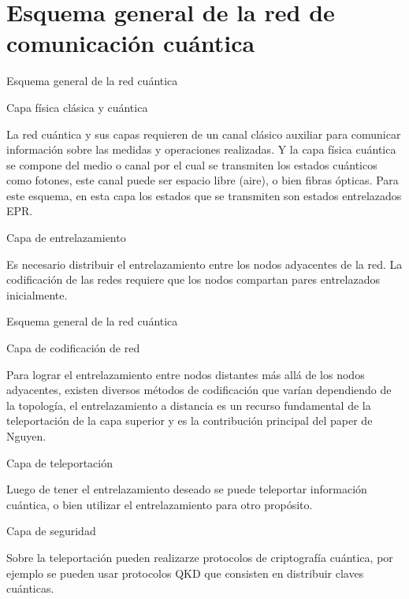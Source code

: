 \documentclass[10pt]{beamer}
\renewenvironment{block}[1]
    {\begin{oldblock}{#1}
        \smallskip
    }
    {
    \end{oldblock}
    }
\begin{document}
\section{Esquema general de la red de comunicación cuántica}
\begin{frame}{Esquema general de la red cuántica}
  \begin{block}{Capa física clásica y cuántica}
    La red cuántica y sus capas requieren de un canal clásico auxiliar para comunicar información sobre las medidas y operaciones realizadas. Y la capa física cuántica se compone del medio o canal por el cual se transmiten los estados cuánticos como fotones, este canal puede ser espacio libre (aire), o bien fibras ópticas. Para este esquema, en esta capa los estados que se transmiten son estados entrelazados EPR.
  \end{block}
  \begin{block}{Capa de entrelazamiento}
    Es necesario distribuir el entrelazamiento entre los nodos adyacentes de la red. La codificación de las redes requiere que los nodos compartan pares entrelazados inicialmente.
  \end{block}
\end{frame}
\begin{frame}{Esquema general de la red cuántica}

  \begin{block}{Capa de codificación de red}
    Para lograr el entrelazamiento entre nodos distantes más allá de los nodos adyacentes, existen diversos métodos de codificación que varían dependiendo de la topología, el entrelazamiento a distancia es un recurso fundamental de la teleportación de la capa superior y es la contribución principal del paper de Nguyen.
  \end{block}
  \begin{block}{Capa de teleportación}
    Luego de tener el entrelazamiento deseado se puede teleportar información cuántica, o bien utilizar el entrelazamiento para otro propósito.
  \end{block}
  \begin{block}{Capa de seguridad}
    Sobre la teleportación pueden realizarze protocolos de criptografía cuántica, por ejemplo se pueden usar protocolos QKD que consisten en distribuir claves cuánticas.
  \end{block}

\end{frame}

\end{document}
